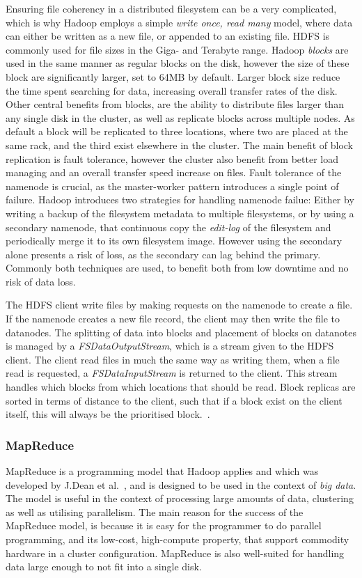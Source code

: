 Ensuring file coherency in a distributed filesystem can be a very complicated, which is why Hadoop employs a simple \emph{write once, read many} model, where data can either be written as a new file, or appended to an existing file. HDFS is commonly used for file sizes in the Giga- and Terabyte range. Hadoop \emph{blocks} are used in the same manner as regular blocks on the disk, however the size of these block are significantly larger, set to 64MB by default. Larger block size reduce the time spent searching for data, increasing overall transfer rates of the disk. Other central benefits from blocks, are the ability to distribute files larger than any single disk in the cluster, as well as replicate blocks across multiple nodes. As default a block will be replicated to three locations, where two are placed at the same rack, and the third exist elsewhere in the cluster. The main benefit of block replication is fault tolerance, however the cluster also benefit from better load managing and an overall transfer speed increase on files. Fault tolerance of the namenode is crucial, as the master-worker pattern introduces a single point of failure. Hadoop introduces two strategies for handling namenode failue: Either by writing a backup of the filesystem metadata to multiple filesystems, or by using a secondary namenode, that continuous copy the \emph{edit-log} of the filesystem and periodically merge it to its own filesystem image. However using the secondary alone presents a risk of loss, as the secondary can lag behind the primary. Commonly both techniques are used, to benefit both from low downtime and no risk of data loss.

The HDFS client write files by making requests on the namenode to create a file. If the namenode creates a new file record, the client may then write the file to datanodes. The splitting of data into blocks and placement of blocks on datanotes is managed by a \emph{FSDataOutputStream}, which is a stream given to the HDFS client. The client read files in much the same way as writing them, when a file read is requested, a \emph{FSDataInputStream} is returned to the client. This stream handles which blocks from which locations that should be read. Block replicas are sorted in terms of distance to the client, such that if a block exist on the client itself, this will always be the prioritised block.~\cite{hadoopIntro}.

\subsubsection{MapReduce}\label{sec:mapreduce_programming_model}
MapReduce is a programming model that Hadoop applies and which was developed by J.\@ Dean et al.~\cite{DeanMapReduce}, and is designed to be used in the context of \emph{big data}. The model is useful in the context of processing large amounts of data, clustering as well as utilising parallelism. The main reason for the success of the MapReduce model, is because it is easy for the programmer to do parallel programming, and its low-cost, high-compute property, that support commodity hardware in a cluster configuration. MapReduce is also well-suited for handling data large enough to not fit into a single disk.

